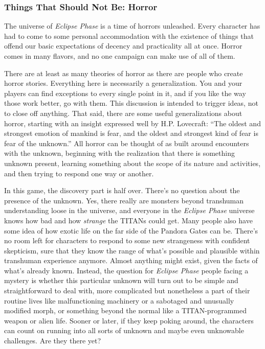 \subsubsection{Things That Should Not Be: Horror }

The universe of \textit{Eclipse Phase} is a time of horrors 
unleashed. Every character has had to come to some 
personal accommodation with the existence of things 
that offend our basic expectations of decency and 
practicality all at once. Horror comes in many flavors, 
and no one campaign can make use of all of them.

There are at least as many theories of horror as 
there are people who create horror stories. Everything 
here is necessarily a generalization. You and your 
players can find exceptions to every single point in 
it, and if you like the way those work better, go with 
them. This discussion is intended to trigger ideas, not 
to close off anything. That said, there are some useful 
generalizations about horror, starting with an insight 
expressed well by H.P. Lovecraft: ``The oldest and 
strongest emotion of mankind is fear, and the oldest 
and strongest kind of fear is fear of the unknown.'' All 
horror can be thought of as built around encounters 
with the unknown, beginning with the realization that 
there is something unknown present, learning something
about the scope of its nature and activities, and
then trying to respond one way or another. 

In this game, the discovery part is half over. There's 
no question about the presence of the unknown. 
Yes, there really are monsters beyond transhuman 
understanding loose in the universe, and everyone in 
the \textit{Eclipse Phase} universe knows how bad and how 
\textit{strange }the TITANs could get. Many people also have 
some idea of how exotic life on the far side of the Pandora
Gates can be. There's no room left for characters
to respond to some new strangeness with confident 
skepticism, sure that they know the range of what's 
possible and plausible within transhuman experience 
anymore. Almost anything might exist, given the 
facts of what's already known. Instead, the question 
for \textit{Eclipse Phase }people facing a mystery is whether 
this particular unknown will turn out to be simple 
and straightforward to deal with, more complicated 
but nonetheless a part of their routine lives like malfunctioning
machinery or a sabotaged and unusually
modified morph, or something beyond the normal like 
a TITAN-programmed weapon or alien life. Sooner or 
later, if they keep poking around, the characters can 
count on running into all sorts of unknown and maybe 
even unknowable challenges. Are they there yet?

